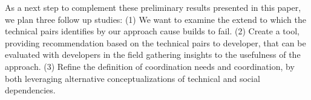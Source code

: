 \documentclass[conference]{IEEEtran}
\begin{document}
As a next step to complement these preliminary results presented in this paper, we plan three follow up studies:
(1) We want to examine the extend to which the technical pairs identifies by our approach cause builds to fail.
(2) Create a tool, providing recommendation based on the technical pairs to developer, that can be evaluated with developers in the field gathering insights to the usefulness of the approach.
(3) Refine the definition of coordination needs and coordination, by both leveraging alternative conceptualizations of technical and social dependencies.


\end{document}
